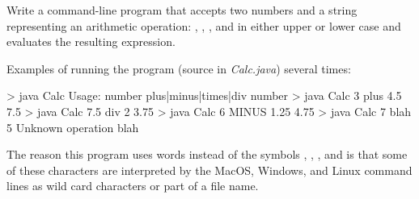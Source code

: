 \begin{exercise}
Write a command-line program that accepts two numbers and a string representing an arithmetic operation: , , , and  in either upper or lower case and evaluates the resulting expression.

Examples of running the program (source in {\em Calc.java}) several times:

\begin{stdout}
> java Calc
Usage: number plus|minus|times|div number
> java Calc 3 plus 4.5
7.5
> java Calc 7.5 div 2
3.75
> java Calc 6 MINUS 1.25
4.75
> java Calc 7 blah 5
Unknown operation blah
\end{stdout}

The reason this program uses words instead of the symbols \java{+}, \java{-}, \java{*}, and \java{/} is that some of these characters are interpreted by the MacOS, Windows, and Linux command lines as wild card characters or part of a file name.
\end{exercise}

